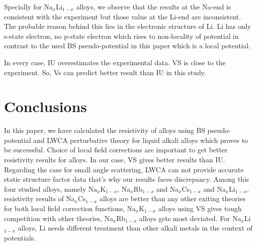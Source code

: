 \documentclass[final12pt]{elsarticle}
\begin{document}
Specially for Na$_x$Li$_{1-x}$ alloys, we observe that the results at the Na-end is consistent with the experiment but those value at the Li-end are inconsistent. The probable reason behind this lies in the electronic structure of Li. Li has only s-state electron, no p-state electron which rises to non-locality of potential in contrast to the used BS pseudo-potential in this paper which is a local potential.

In every case, IU overestimates the experimental data. VS is close to the experiment. So, Vs can predict better result than IU in this study. 


\section{Conclusions}
\label{conclu}
In this paper, we have calculated the resistivity of alloys using BS pseudo-potential and LWCA perturbative theory for liquid alkali alloys which proves to be successful. Choice of local field corrections are important to get better resistivity results for alloys. In our case, VS gives better results than IU. Regarding the case for small angle scattering, LWCA can not provide accurate static structure factor data that's why our results faces discrepancy. Among this four studied alloys, namely Na$_x$K$_{1-x}$, Na$_x$Rb$_{1-x}$ and Na$_x$Cs$_{1-x}$ and Na$_x$Li$_{1-x}$, resistivity results of Na$_x$Cs$_{1-x}$ alloys are better than any other exiting theories for both local field correction functions, Na$_x$K$_{1-x}$ alloys using VS gives tough competition with other theories, Na$_x$Rb$_{1-x}$ alloys gets most deviated. For Na$_x$Li$_{1-x}$ alloys, Li needs different treatment than other alkali metals in the context of potentials.
\newpage
\end{document}

